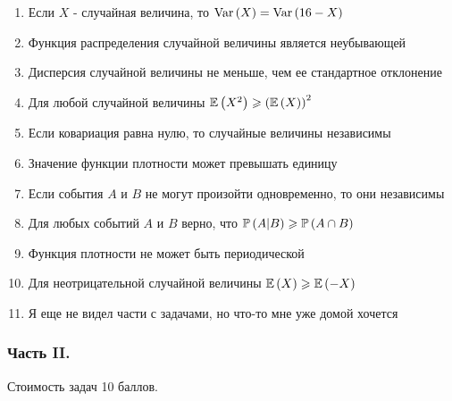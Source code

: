 \documentclass[12pt, a4paper]{article}\usepackage[]{graphicx}\usepackage[]{color}
\begin{document}
\begin{enumerate}
\item Если  $X$  - случайная величина, то  $\Var\left(X\right)=\Var\left(16-X\right)$
\item Функция распределения случайной величины является неубывающей
\item Дисперсия случайной величины не меньше, чем ее стандартное отклонение
\item Для любой случайной величины  $\E\left(X^{2} \right)\ge \left(\E\left(X\right)\right)^{2} $
\item Если ковариация равна нулю, то случайные величины независимы
\item Значение функции плотности может превышать единицу
\item Если события  $A$  и  $B$  не могут произойти одновременно, то они независимы
\item Для любых событий  $A$  и  $B$  верно, что  $\P\left(A|B\right)\ge \P\left(A\cap B\right)$
\item Функция плотности не может быть периодической
\item Для неотрицательной случайной величины  $\E\left(X\right)\ge \E\left(-X\right)$
\item Я еще не видел части с задачами, но что-то мне уже домой хочется
\end{enumerate}

\subsubsection*{Часть II.}

Стоимость задач 10 баллов.
\end{document}
